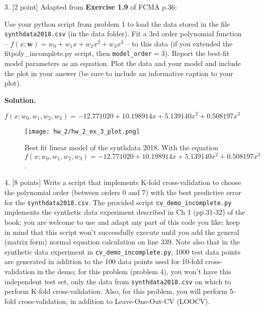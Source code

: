 \documentclass[10pt]{article}
\begin{document}
\begin{itemize}
{\bf Solution.} 

$f(x;w_0, w_1) = 40.924155 + -0.015072 x $


\begin{figure}[H]
  \texttt{[image: hw\_2/hw\_2\_ex\_2\_plot.png]}
  \caption{Best fit linear model of the women’s 100m dash gold medal Olympic results from 1928 to 2008. With the equation $f(x;w_0, w_1) = 40.924155 + -0.015072 x$.  }
\end{figure}


\item[3.] [2 point]
Adapted from {\bf Exercise 1.9} of FCMA p.36:

Use your python script from problem 1 to load the data stored in the file {\tt synthdata2018.csv} (in the data folder).  Fit a 3rd order polynomial function -- $f(x; \mathbf{w}) = w_0 + w_1 x + w_2 x^2 + w_3 x^3$ -- to this data (if you extended the {fitpoly\_incomplete.py} script, then {\tt model\_order}$ = 3$).  
Report the best-fit model parameters as an equation.  Plot the data and your model and include the plot in your answer (be sure to include an informative caption to your plot).

{\bf Solution.} 

$f(x;w_0, w_1, w_2, w_3) = -12.771020 + 10.198914 x + 5.139140 x^2 + 0.508197 x^3 $

\begin{figure}[H]
  \texttt{[image: hw\_2/hw\_2\_ex\_3\_plot.png]}
  \caption{Best fit linear model of the synthdata 2018. With the equation $f(x;w_0, w_1, w_2, w_3) = -12.771020 + 10.198914 x + 5.139140 x^2 + 0.508197 x^3 $.  }
\end{figure}



\item[4.] [8 points]
Write a script that implements K-fold cross-validation to choose the polynomial order (between orders 0 and 7) with the best predictive error for the {\tt synthdata2018.csv}.  The provided script {\tt cv\_demo\_incomplete.py} implements the synthetic data experiment described in Ch 1 (pp.31-32) of the book; you are welcome to use and adapt any part of this code you like; keep in mind that this script won't successfully execute until you add the general (matrix form) normal equation calculation on line 339.
Note also that in the synthetic data experiment in {\tt cv\_demo\_incomplete.py}, 1000 test data points are generated in addition to the 100 data points used for 10-fold cross-validation in the demo; for this problem (problem 4), you won't have this independent test set, only the data from {\tt synthdata2018.csv} on which to perform K-fold cross-validation.  Also, for this problem, you will perform 5-fold cross-validation, in addition to Leave-One-Out-CV (LOOCV).


\end{itemize}
\end{document}
